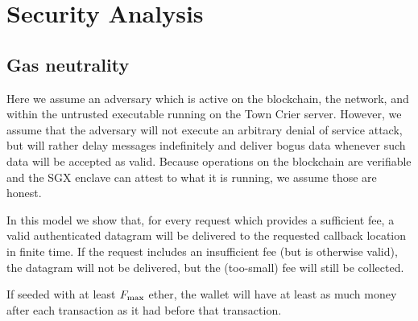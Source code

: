 \section{Security Analysis}


\subsection{Gas neutrality}

Here we assume an adversary which is active on the blockchain, the network, and within the untrusted executable running on the Town Crier server.
However, we assume that the adversary will not execute an arbitrary denial of service attack, but will rather delay messages indefinitely and deliver bogus data whenever such data will be accepted as valid.
Because operations on the blockchain are verifiable and the SGX enclave can attest to what it is running, we assume those are honest.

In this model we show that, for every request which provides a sufficient fee,
a valid authenticated datagram will be delivered to the requested callback location in finite time.
If the request includes an insufficient fee (but is otherwise valid),
the datagram will not be delivered, but the (too-small) fee will still be collected.

\begin{lemma} \label{lem:non-bankrupt-p_sgx}
If seeded with at least $F_{\rm max}$ ether, the \sgxadd wallet will have
at least as much money after each transaction as it had before that transaction.
\end{lemma}

